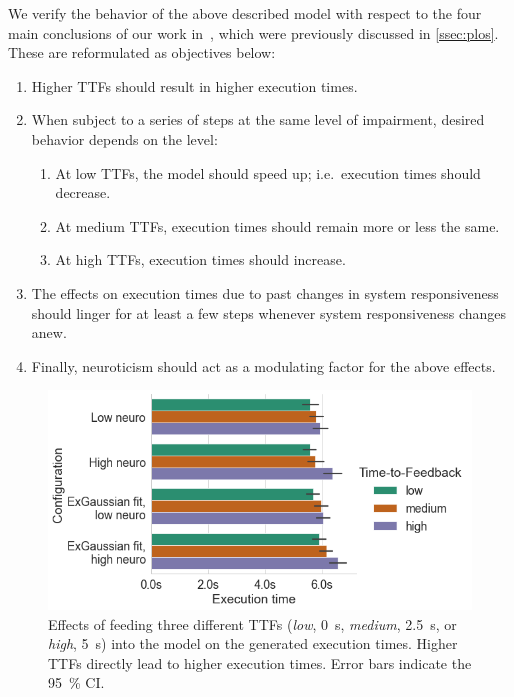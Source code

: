 We verify the behavior of the above described model with respect to the four main conclusions of our work in~\cite{olguinmunoz2021impact}, which were previously discussed in \cref{ssec:plos}.
These are reformulated as objectives below:

\begin{enumerate}
    \item\label{it:ttftoexectime} Higher \acp{TTF} should result in higher execution times.
    \item\label{it:duration} When subject to a series of steps at the same level of impairment, desired behavior depends on the level:
    \begin{enumerate}
        \item At low \acp{TTF}, the model should speed up; i.e.\ execution times should decrease.
        \item At medium \acp{TTF}, execution times should remain more or less the same.
        \item At high \acp{TTF}, execution times should increase.
    \end{enumerate}
    \item The effects on execution times due to past changes in system responsiveness should linger for at least a few steps whenever system responsiveness changes anew.
    \item\label{it:neuro} Finally, neuroticism should act as a modulating factor for the above effects.
\end{enumerate}

\begin{figure}
    \centering
    \includegraphics[width=\columnwidth]{figs/new_model/ttf_to_exectime.png}
    \caption{%
        Effects of feeding three different \acp{TTF} (\emph{low}, \SI{0}{\second}, \emph{medium}, \SI{2.5}{\second}, or \emph{high}, \SI{5}{\second}) into the model on the generated execution times.
        Higher \acp{TTF} directly lead to higher execution times.
        Error bars indicate the \SI{95}{\percent} \ac{CI}.
    }\label{fig:ttf_to_exectime}
\end{figure}

